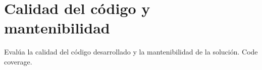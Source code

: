 \section{Calidad del código y mantenibilidad}

Evalúa la calidad del código desarrollado y la mantenibilidad de la solución.
Code coverage.